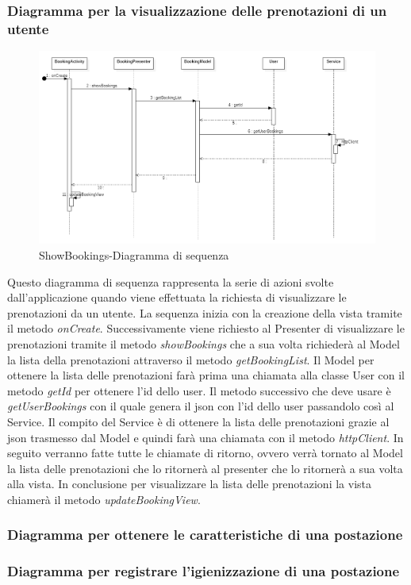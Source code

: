 \subsubsection{Diagramma per la visualizzazione delle prenotazioni di un utente}
\begin{figure}[H]
	\centering
	\includegraphics[width=16cm]{res/images/apputenti-showBookingsSeq.png}
	\caption{ShowBookings-Diagramma di sequenza}
	\label{fig:ShowBookings-Diagramma di sequenza}
\end{figure}
Questo diagramma di sequenza rappresenta la serie di azioni svolte dall'applicazione quando viene effettuata la richiesta di visualizzare le prenotazioni da un utente.
La sequenza inizia con la creazione della vista tramite il metodo \textit{onCreate}. Successivamente viene richiesto al Presenter di visualizzare le prenotazioni tramite il metodo \textit{showBookings} che a sua volta richiederà al Model la lista della prenotazioni attraverso il metodo \textit{getBookingList}.
Il Model per ottenere la lista delle prenotazioni farà prima una chiamata alla classe User con il metodo \textit{getId} per ottenere l'id dello user.
Il metodo successivo che deve usare è \textit{getUserBookings} con il quale genera il json con l'id dello user passandolo così al Service.
Il compito del Service è di ottenere la lista delle prenotazioni grazie al json trasmesso dal Model e quindi farà una chiamata con il metodo \textit{httpClient}.
In seguito verranno fatte tutte le chiamate di ritorno, ovvero verrà tornato al Model la lista delle prenotazioni che lo ritornerà al presenter che lo ritornerà a sua volta alla vista.
In conclusione per visualizzare la lista delle prenotazioni la vista chiamerà il metodo \textit{updateBookingView}. 

\subsubsection{Diagramma per ottenere le caratteristiche di una postazione}

\subsubsection{Diagramma per registrare l'igienizzazione di una postazione} 

